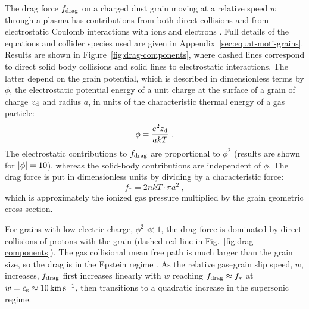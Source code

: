The drag force \(f_{\text{drag}}\) on a charged dust grain moving at a relative
speed \(w\) through a plasma has contributions from both direct
collisions and from electrostatic Coulomb interactions with ions and
electrons \citep{Draine:1979a}.  Full details of the equations and
collider species used are given in
Appendix~\ref{sec:equat-moti-grains}. Results are shown in
Figure~\ref{fig:drag-components}, where dashed lines correspond to
direct solid body collisions and solid lines to electrostatic
interactions.  The latter depend on the grain potential, which is
described in dimensionless terms by \(\phi\), the electrostatic potential
energy of a unit charge at the surface of a grain of charge
\(z_{\text{d}}\) and radius \(a\), in units of the characteristic thermal
energy of a gas particle:
\begin{equation}
  \label{eq:phi-potential}
  \phi = \frac{e^2 z_{\text{d}}}{a kT} \ .
\end{equation}
The electrostatic contributions to \(f_{\text{drag}}\) are proportional to
\(\phi^2\) (results are shown for \(\lvert\phi\rvert = 10\)), whereas the
solid-body contributions are independent of \(\phi\).  The drag force is
put in dimensionless units by dividing by a characteristic force:
\begin{equation}
  \label{eq:fstar}
  f_* = 2 n k T \cdot \pi a^2 \ , 
\end{equation}
which is approximately the ionized gas pressure multiplied by the
grain geometric cross section.

For grains with low electric charge, \(\phi^2 \ll 1\), the drag force is
dominated by direct collisions of protons with the grain (dashed red
line in Fig.~\ref{fig:drag-components}).  The gas collisional mean
free path is much larger than the grain size, so the drag is in the
Epstein regime \citep{Weidenschilling:1977b}.
As the relative gas--grain slip speed, \(w\), increases, \(f_{\text{drag}}\)
first increases linearly with \(w\) reaching \(f_{\text{drag}} \approx f_*\) at
\(w = c_{\text{s}} \approx \SI{10}{km.s^{-1}}\), then transitions to a quadratic
increase in the supersonic regime.

